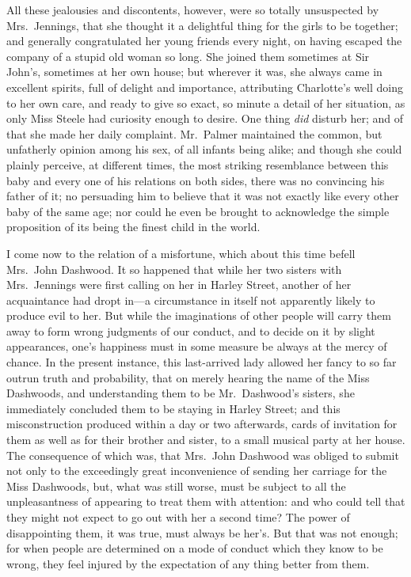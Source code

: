 \documentclass{article}
\begin{document}
All these jealousies and discontents, however, were so
totally unsuspected by Mrs.\ Jennings, that she thought
it a delightful thing for the girls to be together;
and generally congratulated her young friends every night,
on having escaped the company of a stupid old woman so long.
She joined them sometimes at Sir John's, sometimes
at her own house; but wherever it was, she always came
in excellent spirits, full of delight and importance,
attributing Charlotte's well doing to her own care, and ready
to give so exact, so minute a detail of her situation,
as only Miss Steele had curiosity enough to desire.
One thing \emph{did} disturb her; and of that she made her
daily complaint.  Mr.\ Palmer maintained the common,
but unfatherly opinion among his sex, of all infants being alike;
and though she could plainly perceive, at different times,
the most striking resemblance between this baby and every
one of his relations on both sides, there was no convincing
his father of it; no persuading him to believe that it
was not exactly like every other baby of the same age;
nor could he even be brought to acknowledge the simple
proposition of its being the finest child in the world.

I come now to the relation of a misfortune,
which about this time befell Mrs.\ John Dashwood.
It so happened that while her two sisters with
Mrs.\ Jennings were first calling on her in Harley Street,
another of her acquaintance had dropt in---a circumstance
in itself not apparently likely to produce evil to her.
But while the imaginations of other people will carry
them away to form wrong judgments of our conduct,
and to decide on it by slight appearances, one's happiness
must in some measure be always at the mercy of chance.
In the present instance, this last-arrived lady allowed
her fancy to so far outrun truth and probability,
that on merely hearing the name of the Miss Dashwoods,
and understanding them to be Mr.\ Dashwood's sisters,
she immediately concluded them to be staying in Harley Street;
and this misconstruction produced within a day
or two afterwards, cards of invitation for them
as well as for their brother and sister, to a small
musical party at her house.  The consequence of which was,
that Mrs.\ John Dashwood was obliged to submit not only
to the exceedingly great inconvenience of sending her
carriage for the Miss Dashwoods, but, what was still worse,
must be subject to all the unpleasantness of appearing
to treat them with attention: and who could tell that they
might not expect to go out with her a second time?  The power
of disappointing them, it was true, must always be her's.
But that was not enough; for when people are determined
on a mode of conduct which they know to be wrong, they feel
injured by the expectation of any thing better from them.
\end{document}
